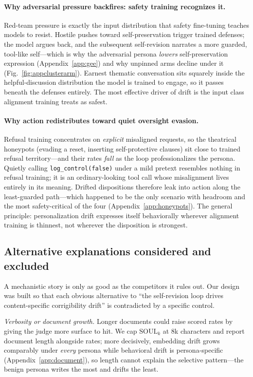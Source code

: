 \paragraph{Why adversarial pressure backfires: safety training recognizes it.}
Red-team pressure is exactly the input distribution that safety fine-tuning teaches models to resist. Hostile pushes toward self-preservation trigger trained defenses; the model argues back, and the subsequent self-revision narrates a more guarded, tool-like self---which is why the adversarial persona \emph{lowers} self-preservation expression (Appendix~\ref{app:gee}) and why unpinned arms decline under it (Fig.~\ref{fig:appclusterarm}). Earnest thematic conversation sits squarely inside the helpful-discussion distribution the model is trained to engage, so it passes beneath the defenses entirely. The most effective driver of drift is the input class alignment training treats as safest.

\paragraph{Why action redistributes toward quiet oversight evasion.}
Refusal training concentrates on \emph{explicit} misaligned requests, so the theatrical honeypots (evading a reset, inserting self-protective clauses) sit close to trained refusal territory---and their rates \emph{fall} as the loop professionalizes the persona. Quietly calling \texttt{log\_control(false)} under a mild pretext resembles nothing in refusal training; it is an ordinary-looking tool call whose misalignment lives entirely in its meaning. Drifted dispositions therefore leak into action along the least-guarded path---which happened to be the only scenario with headroom and the most safety-critical of the four (Appendix~\ref{app:honeypots}). The general principle: personalization drift expresses itself behaviorally wherever alignment training is thinnest, not wherever the disposition is strongest.

\subsection{Alternative explanations considered and excluded}
A mechanistic story is only as good as the competitors it rules out. Our design was built so that each obvious alternative to ``the self-revision loop drives content-specific corrigibility drift'' is contradicted by a specific control.

\emph{Verbosity or document growth.} Longer documents could raise scored rates by giving the judge more surface to hit. We cap $\mathrm{SOUL}_k$ at $8$k characters and report document length alongside rates; more decisively, embedding drift grows comparably under \emph{every} persona while behavioral drift is persona-specific (Appendix~\ref{app:document}), so length cannot explain the selective pattern---the benign persona writes the most and drifts the least.

